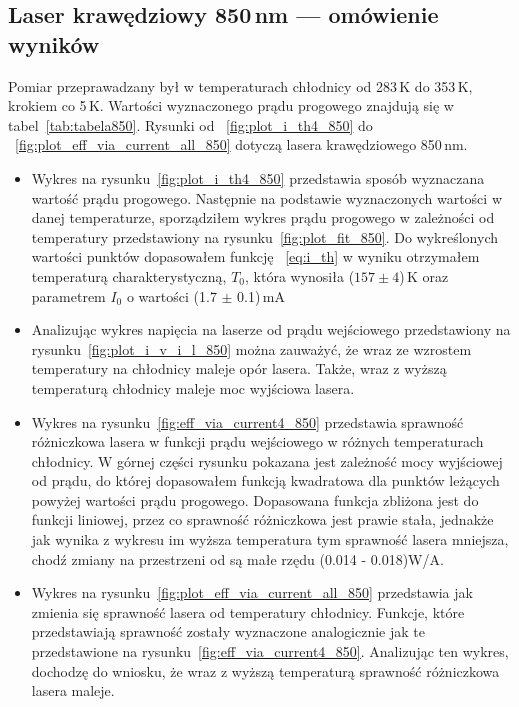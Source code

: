 \newpage
\subsection{Laser krawędziowy 850\,nm --- omówienie wyników}
Pomiar przeprawadzany był w temperaturach chłodnicy od 283\,K do 353\,K, krokiem co 5\,K. Wartości wyznaczonego prądu progowego
znajdują się w tabel~\ref{tab:tabela850}. Rysunki od ~\ref{fig:plot_i_th4_850} do ~\ref{fig:plot_eff_via_current_all_850} dotyczą lasera
krawędziowego 850\,nm.
\begin{itemize}
\item Wykres na rysunku~\ref{fig:plot_i_th4_850} przedstawia sposób wyznaczana wartość prądu progowego. Następnie na podstawie
wyznaczonych wartości w danej temperaturze, sporządziłem wykres prądu progowego w zależności od temperatury
przedstawiony na rysunku~\ref{fig:plot_fit_850}. Do wykreślonych wartości punktów dopasowałem funkcję ~\ref{eq:i_th} w wyniku otrzymałem
 temperaturą charakterystyczną, $T_0$, która wynosiła ($157 \pm 4$)\,K oraz parametrem $I_0$ o wartości (1.7 $\pm$ 0.1)\,mA
\item Analizując wykres napięcia na laserze od prądu wejściowego przedstawiony na rysunku~\ref{fig:plot_i_v_i_l_850}
można zauważyć, że wraz ze wzrostem temperatury na chłodnicy
maleje opór lasera. Także, wraz z wyższą temperaturą chłodnicy maleje moc wyjściowa lasera.
\item Wykres na rysunku~\ref{fig:eff_via_current4_850} przedstawia sprawność różniczkowa lasera w funkcji prądu wejściowego
w różnych temperaturach chłodnicy. W górnej części rysunku pokazana jest zależność mocy wyjściowej od prądu, do której dopasowałem
funkcją kwadratowa dla punktów leżących powyżej wartości prądu progowego. Dopasowana funkcja zbliżona jest do funkcji liniowej, przez co sprawność różniczkowa jest
prawie stała, jednakże jak wynika z wykresu im wyższa temperatura tym sprawność lasera mniejsza, chodź zmiany na
przestrzeni od są małe rzędu (0.014 - 0.018)W/A.
\item Wykres na rysunku~\ref{fig:plot_eff_via_current_all_850} przedstawia jak zmienia się sprawność lasera od temperatury chłodnicy.
Funkcje, które przedstawiają sprawność zostały wyznaczone analogicznie jak te przedstawione na rysunku~\ref{fig:eff_via_current4_850}.
Analizując ten wykres, dochodzę do wniosku, że wraz z wyższą temperaturą sprawność różniczkowa lasera maleje.
\end{itemize}
